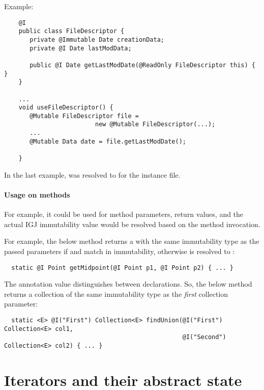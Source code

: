   Example:
\begin{Verbatim}
    @I
    public class FileDescriptor {
       private @Immutable Date creationData;
       private @I Date lastModData;

       public @I Date getLastModDate(@ReadOnly FileDescriptor this) { }
    }

    ...
    void useFileDescriptor() {
       @Mutable FileDescriptor file =
                         new @Mutable FileDescriptor(...);
       ...
       @Mutable Data date = file.getLastModDate();

    }
\end{Verbatim}

In the last example,  was resolved to  for the instance file.

\paragraph{Usage on methods\label{igj-usage-on-methods}}

For example, it could be used for method parameters, return values, and the
actual IGJ immutability value would be resolved based on the method invocation.

For example, the below method  returns a  with the same
immutability type as the passed parameters if  and  match
in immutability, otherwise  is resolved to :

\begin{Verbatim}
  static @I Point getMidpoint(@I Point p1, @I Point p2) { ... }
\end{Verbatim}

The  annotation value distinguishes between 
declarations.  So, the below method  returns a collection of the same
immutability type as the \emph{first} collection parameter:

\begin{Verbatim}
  static <E> @I("First") Collection<E> findUnion(@I("First") Collection<E> col1,
                                                 @I("Second") Collection<E> col2) { ... }
\end{Verbatim}


\section{Iterators and their abstract state\label{igj-library-annotations}}

